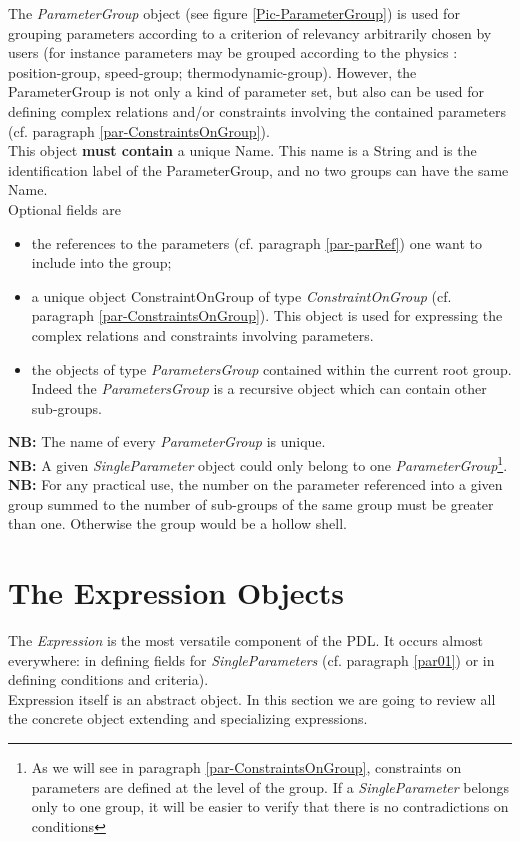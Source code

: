 \documentclass[a4paper,11pt] {ivoa}
\begin{document}
The {\it ParameterGroup} object (see figure \ref{Pic-ParameterGroup}) is used for grouping
parameters according to a criterion of relevancy arbitrarily chosen by users (for instance
parameters may be grouped according to the physics : position-group, speed-group; thermodynamic-group).
However,  the ParameterGroup is not only a kind of parameter set, but also can be used for
defining complex relations and/or constraints involving the contained parameters (cf. paragraph
\ref{par-ConstraintsOnGroup}).\\
This object {\bf must contain} a unique Name. This name is a String and is the identification label
of the ParameterGroup, and no two groups can have the same Name.\\
Optional fields are
\begin{itemize}
\item the references to the parameters (cf. paragraph \ref{par-parRef}) one want to include into the
group;
\item a unique object ConstraintOnGroup of type {\it ConstraintOnGroup} (cf. paragraph 
\ref{par-ConstraintsOnGroup}). This object is used for expressing the complex relations and
constraints involving parameters.
\item the objects of type {\it ParametersGroup} contained within the current root group. Indeed the
{\it ParametersGroup} is a recursive object which can contain other sub-groups.
\end{itemize}

{\bf NB:} The name of every {\it ParameterGroup} is unique.\\

{\bf NB:} A given {\it SingleParameter} object could only belong to one {\it
ParameterGroup}\footnote{As we will see in paragraph \ref{par-ConstraintsOnGroup}, constraints on
parameters are defined at the level of the group. If a {\it SingleParameter} belongs only to one
group, it will be easier to verify that there is no contradictions on conditions}.
{\bf NB:}  For any practical use, the number on the parameter referenced into a given group summed
to the number of sub-groups of the same group must be greater than one. Otherwise the group would be
a hollow shell.


\section{The Expression Objects}\label{par02}
The {\it Expression} is the most versatile component of the PDL. It occurs almost everywhere: in
defining fields for {\it SingleParameters} (cf. paragraph \ref{par01}) or in defining conditions and
criteria).\\
Expression itself is an abstract object. In this section we are going to review all the concrete
object extending and specializing expressions.\\
\end{document}
